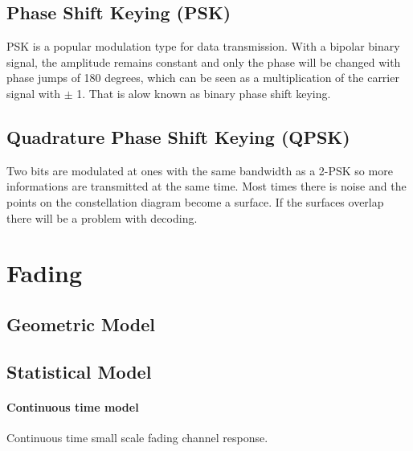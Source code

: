 \subsection{Phase Shift Keying (PSK)}

PSK is a popular modulation type for data transmission\cite{Meyer2011}. With a bipolar binary signal, the amplitude remains constant and only the phase will be changed with phase jumps of 180 degrees, which can be seen as a multiplication of the carrier signal with $\pm$ 1. That is alow known as binary phase shift keying.


\subsection{Quadrature Phase Shift Keying (QPSK)}

Two bits are modulated at ones with the same bandwidth as a 2-PSK so more informations are transmitted at the same time. \cite{Meyer2011}
Most times there is noise and the points on the constellation diagram become a surface. 
If the surfaces overlap there will be a problem with decoding. 

\section{Fading}

\subsection{Geometric Model}


\subsection{Statistical Model}


\paragraph{Continuous time model}

Continuous time small scale fading channel response.

